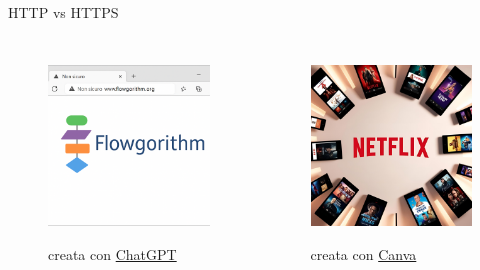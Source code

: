 \documentclass[aspectratio=1610]{beamer}
\begin{document}
\begin{frame}{HTTP vs HTTPS}
    \begin{columns}
            \begin{figure}
                \href{http://www.flowgorithm.org/}{\includegraphics[width=\linewidth]{img/flowgorithm.png}}
                \caption{{creata con \href{https://chatgpt.com/}{ChatGPT}}}
            \end{figure}
            \begin{figure}
                \href{https://www.netflix.com/it/}{\includegraphics[width=\linewidth]{img/netflix.png}}
                \caption{{creata con \href{https://www.canva.com/}{Canva}}}
            \end{figure}
    \end{columns}
\end{frame}
\end{document}
